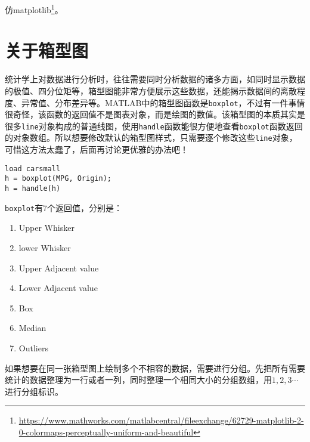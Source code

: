 仿matplotlib\footnote{\url{https://www.mathworks.com/matlabcentral/fileexchange/62729-matplotlib-2-0-colormaps-perceptually-uniform-and-beautiful}}。

\section{关于箱型图}

统计学上对数据进行分析时，往往需要同时分析数据的诸多方面，如同时显示数据的极值、四分位矩等，箱型图能非常方便展示这些数据，还能揭示数据间的离散程度、异常值、分布差异等。MATLAB中的箱型图函数是\texttt{boxplot}，不过有一件事情很奇怪，该函数的返回值不是图表对象，而是绘图的数值。该箱型图的本质其实是很多\texttt{line}对象构成的普通线图，使用\texttt{handle}函数能很方便地查看\texttt{boxplot}函数返回的对象数组。所以想要修改默认的箱型图样式，只需要逐个修改这些\texttt{line}对象，可惜这方法太蠢了，后面再讨论更优雅的办法吧！

\begin{verbatim}
load carsmall
h = boxplot(MPG, Origin);
h = handle(h)
\end{verbatim}

\texttt{boxplot}有7个返回值，分别是：

\begin{enumerate}
    \item Upper Whisker
    \item lower Whisker
    \item Upper Adjacent value
    \item Lower Adjacent value
    \item Box
    \item Median
    \item Outliers
\end{enumerate}

如果想要在同一张箱型图上绘制多个不相容的数据，需要进行分组。先把所有需要统计的数据整理为一行或者一列，同时整理一个相同大小的分组数组，用$ 1, 2, 3 \cdots $进行分组标识。



